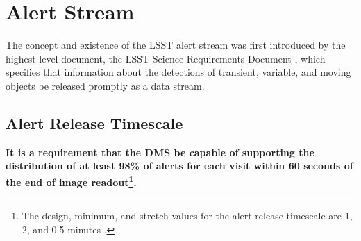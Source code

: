 \documentclass[DM,authoryear,toc]{lsstdoc}
\begin{document}


\section{Alert Stream} \label{sec:alerts}

The concept and existence of the \gls{LSST} alert stream was first introduced by the highest-level document, the \gls{LSST} Science Requirements \gls{Document} , which specifies that information about the detections of \gls{transient}, variable, and moving objects be released promptly as a data stream.


\subsection{Alert \gls{Release} Timescale}\label{ssec:OTT1}

{\bf It is a requirement that the \gls{DMS} be capable of supporting the distribution of at least 98\% of alerts for each visit within 60 seconds of the end of image readout\footnote{The design, minimum, and stretch values for the alert release timescale are 1, 2, and 0.5 minutes .}.}
\end{document}
